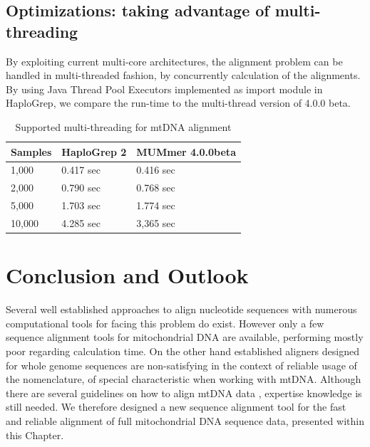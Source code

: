 \subsection{Optimizations: taking advantage of multi-threading}
By exploiting current multi-core architectures, the alignment problem can be handled in multi-threaded fashion, by concurrently calculation of the alignments. By using Java Thread Pool Executors implemented as import module in HaploGrep, we compare the run-time to the multi-thread version of  4.0.0 beta. 

\begin{table}[H]
\centering
\caption{Supported multi-threading for mtDNA alignment}
\label{time:threads}
\begin{tabular}{|l|l|l|}
\hline
Samples &  HaploGrep 2 &  MUMmer 4.0.0beta   \\ \hline
1,000    & 0.417 sec  &   0.416 sec       \\ \hline
2,000    & 0.790 sec &   0.768 sec       \\ \hline
5,000    & 1.703 sec &   1.774 sec       \\ \hline
10,000   & 4.285 sec &   3,365 sec       \\ \hline 
\end{tabular}
\end{table}


\section{Conclusion and Outlook}
Several well established approaches to align nucleotide sequences with numerous computational tools for facing this problem do exist. However only a few sequence alignment tools for mitochondrial DNA are available, performing mostly poor regarding calculation time. On the other hand established aligners designed for whole genome sequences are non-satisfying in the context of reliable usage of the nomenclature, of special characteristic when working with mtDNA. Although there are several guidelines on how to align mtDNA data \cite{Wilson2002,Bandelt2008,Polanskey2010}, expertise knowledge is still needed. We therefore designed a new sequence alignment tool for the fast and reliable alignment of full mitochondrial DNA sequence data, presented within this Chapter. 

